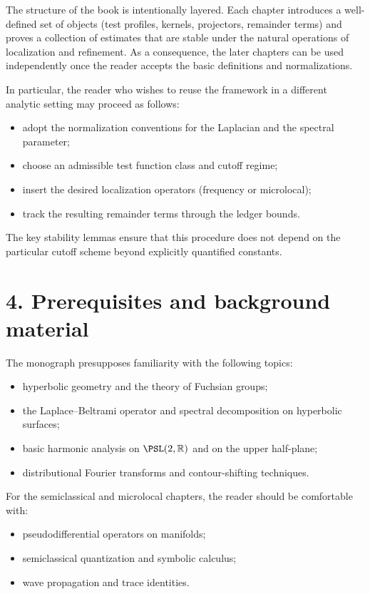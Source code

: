 \noindent
The structure of the book is intentionally layered.
Each chapter introduces a well-defined set of objects (test profiles, kernels, projectors, remainder terms) and proves a collection of estimates that are stable under the natural operations of localization and refinement.
As a consequence, the later chapters can be used independently once the reader accepts the basic definitions and normalizations.

\medskip

\noindent
In particular, the reader who wishes to reuse the framework in a different analytic setting may proceed as follows:
\begin{itemize}
  \item adopt the normalization conventions for the Laplacian and the spectral parameter;
  \item choose an admissible test function class and cutoff regime;
  \item insert the desired localization operators (frequency or microlocal);
  \item track the resulting remainder terms through the ledger bounds.
\end{itemize}
The key stability lemmas ensure that this procedure does not depend on the particular cutoff scheme beyond explicitly quantified constants.

\section*{4. Prerequisites and background material}

\noindent
The monograph presupposes familiarity with the following topics:
\begin{itemize}
  \item hyperbolic geometry and the theory of Fuchsian groups;
  \item the Laplace--Beltrami operator and spectral decomposition on hyperbolic surfaces;
  \item basic harmonic analysis on $\PSL(2,\mathbb{R})$ and on the upper half-plane;
  \item distributional Fourier transforms and contour-shifting techniques.
\end{itemize}
For the semiclassical and microlocal chapters, the reader should be comfortable with:
\begin{itemize}
  \item pseudodifferential operators on manifolds;
  \item semiclassical quantization and symbolic calculus;
  \item wave propagation and trace identities.
\end{itemize}

